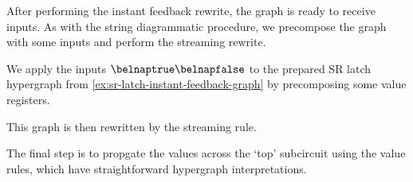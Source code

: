 After performing the instant feedback rewrite, the graph is ready to receive
inputs.
As with the string diagrammatic procedure, we precompose the graph with some
inputs and perform the streaming rewrite.

\begin{example}\label{ex:sr-latch-streaming-graph}
    We apply the inputs \(\belnaptrue\belnapfalse\) to the prepared SR latch
    hypergraph from \cref{ex:sr-latch-instant-feedback-graph} by precomposing
    some value registers.
    \begin{center}
    \end{center}
    This graph is then rewritten by the streaming rule.
    \begin{center}
    \end{center}
\end{example}

The final step is to propgate the values across the `top' subcircuit using the
value rules, which have straightforward hypergraph interpretations.

\begin{center}
    
    \quad
    
    \\
    
    \quad
    \raisebox{0.6em}{}
\end{center}

